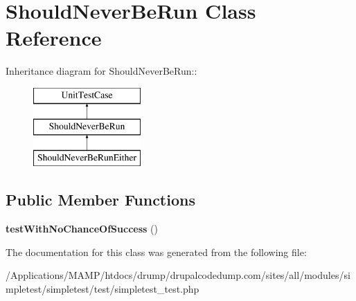 \hypertarget{class_should_never_be_run}{
\section{ShouldNeverBeRun Class Reference}
\label{class_should_never_be_run}
}
Inheritance diagram for ShouldNeverBeRun::\begin{figure}[H]
\begin{center}
\leavevmode
\includegraphics[height=3cm]{class_should_never_be_run}
\end{center}
\end{figure}
\subsection*{Public Member Functions}
\begin{DoxyCompactItemize}
\item 
\hypertarget{class_should_never_be_run_a113375f78f8d432c348e977c7c8e6d3a}{
{\bfseries testWithNoChanceOfSuccess} ()}
\label{class_should_never_be_run_a113375f78f8d432c348e977c7c8e6d3a}

\end{DoxyCompactItemize}


The documentation for this class was generated from the following file:\begin{DoxyCompactItemize}
\item 
/Applications/MAMP/htdocs/drump/drupalcodedump.com/sites/all/modules/simpletest/simpletest/test/simpletest\_\-test.php\end{DoxyCompactItemize}
